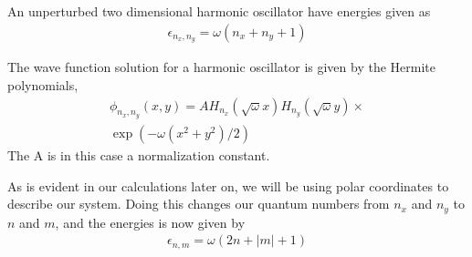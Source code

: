 \documentclass[11pt]{article}
\begin{document}
An unperturbed two dimensional harmonic oscillator have energies given as
\begin{align}
	\epsilon_{n_x,n_y} = \omega(n_x + n_y + 1)
	\label{eq:ho-energy-cartesian}
\end{align}

The wave function solution for a harmonic oscillator is given by the Hermite polynomials,
\begin{align}
	\phi_{n_x,n_y}(x,y) = AH_{n_x}(\sqrt{\omega}x)H_{n_y}(\sqrt{\omega}y)\times \nonumber \\
	\exp(-\omega(x^2 + y^2)/2)
\end{align}
The A is in this case a normalization constant.

As is evident in our calculations later on, we will be using polar coordinates to describe our system. Doing this changes our quantum numbers from $n_x$ and $n_y$ to $n$ and $m$, and the energies is now given by
\begin{align}
	\epsilon_{n, m} = \omega(2n + |m| + 1)
	\label{eq:ho-energy-polar}
\end{align}
\end{document}
